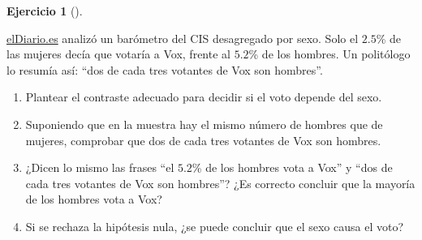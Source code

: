 \documentclass[
  spanish,
  a4paper,
]{scrreport}
\theoremstyle{definition}
\newtheorem{exercise}{Ejercicio}[chapter]
\theoremstyle{remark}
\begin{document}
\begin{exercise}[]\protect\hypertarget{exr-interpretacion-sexo-voto}{}\label{exr-interpretacion-sexo-voto}

\href{https://www.eldiario.es/politica/vox-reduciria-resultados-electorales-votaran_1_1608493.html}{elDiario.es}
analizó un barómetro del CIS desagregado por sexo. Solo el \(2.5\)\% de
las mujeres decía que votaría a Vox, frente al \(5.2\)\% de los hombres.
Un politólogo lo resumía así: ``dos de cada tres votantes de Vox son
hombres''.

\begin{enumerate}
\def\labelenumi{\alph{enumi}.}
\item
  Plantear el contraste adecuado para decidir si el voto depende del
  sexo.
\item
  Suponiendo que en la muestra hay el mismo número de hombres que de
  mujeres, comprobar que dos de cada tres votantes de Vox son hombres.
\item
  ¿Dicen lo mismo las frases ``el \(5.2\)\% de los hombres vota a Vox''
  y ``dos de cada tres votantes de Vox son hombres''? ¿Es correcto
  concluir que la mayoría de los hombres vota a Vox?
\item
  Si se rechaza la hipótesis nula, ¿se puede concluir que el sexo causa
  el voto?
\end{enumerate}

\end{exercise}
\end{document}
